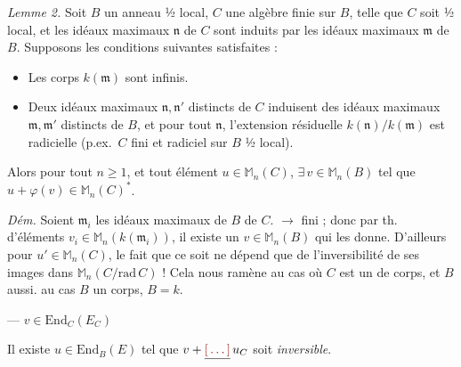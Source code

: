 \documentclass[11pt,a4paper]{article}
\begin{document}


\emph{Lemme 2.} Soit $B$ un anneau ½ local, $C$ une algèbre finie sur $B$,
telle que $C$ soit ½ local, et les idéaux maximaux \struck{\ill{}}
$\mathfrak{n}$ de $C$ sont induits par les idéaux maximaux \struck{\ill{}}
$\mathfrak{m}$ de $B$. Supposons les conditions suivantes satisfaites :
\begin{itemize}
  \item[(i)] Les corps $k(\mathfrak{m})$ sont infinis.
  \item[(ii)] Deux idéaux maximaux $\mathfrak{n}, \mathfrak{n}'$ distincts de
  $C$ induisent des idéaux maximaux $\mathfrak{m}, \mathfrak{m}'$ distincts de
  $B$, et pour tout $\mathfrak{n}$, l'extension résiduelle
  $k(\mathfrak{n})/k(\mathfrak{m})$ est radicielle (p.ex.\ $C$ fini et
  radiciel sur $B$ ½ local).
\end{itemize}
Alors pour tout $n \geqslant 1$, et tout élément $u \in \mathbb{M}_n(C)$,
$\exists\, v \in \mathbb{M}_n(B)$ tel que $u + \varphi(v) \in \mathbb{M}_n(C)^{*}$.

\emph{Dém.} Soient $\mathfrak{m}_i$ 
les idéaux maximaux de $B$ \ill{} \ill{} \ill{} de $C$. \ill{} \ill{}
\ill{} $\to$ fini ; \ill{} \ill{} donc par th.\ \ill{} \ill{} \ill{}
d'éléments $v_i \in \mathbb{M}_n(k(\mathfrak{m}_i))$, il existe un
$v \in \mathbb{M}_n(B)$ qui les donne. D'ailleurs pour $u' \in
\mathbb{M}_n(C)$, le fait que ce soit  ne dépend que
de l'inversibilité de ses images dans $\mathbb{M}_n(C/\mathrm{rad}\,C)$ !
Cela nous ramène au cas où $C$ est un  de corps, et $B$
aussi.  \ill{} \ill{} au cas $B$ un corps, $B = k$.


\ill{} --- $v \in \mathrm{End}_C(E_C)$

Il existe $u \in \mathrm{End}_B(E)$ tel que $v + \struck{\ill{}}\, u_C$
soit \emph{inversible}.
\end{document}
